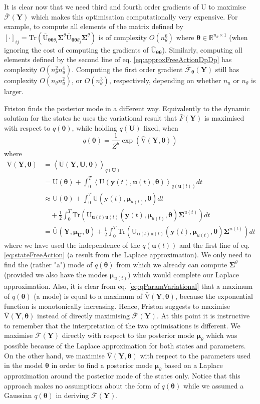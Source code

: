 \documentclass[a4paper,10pt]{article}
\newcommand{\bs}[1]{\mathbf{#1}}					%
\newcommand{\bgs}[1]{\boldsymbol{#1}}				%
\newcommand{\eq}[1]{\begin{equation} #1 \end{equation}}%
\newcommand{\trace}[1]{\mathrm{Tr}\left(#1\right)}					%
\renewcommand{\ss}{u}         %
\newcommand{\so}{y}         %
\renewcommand{\sp}{\theta}    %
\newcommand{\ps}{\bs{\ss}}    %
\newcommand{\po}{\bs{\so}}    %
\newcommand{\pp}{\bgs{\sp}} %
\newcommand{\Ps}{\bs{U}}    %
\newcommand{\Po}{\bs{Y}}    %
\newcommand{\E}[2][]{\left\langle #2 \right\rangle_{#1}}	%
\newcommand{\U}{\mathrm{U}}			%
\newcommand{\Ua}{\bar{\mathrm{U}}}		%
\newcommand{\Va}{\bar{\mathrm{V}}}		%
\newcommand{\Fa}{\bar{\mathcal{F}}}		%
\newcommand{\R}{\mathbb{R}}				%
\newcommand{\Cov}{\bgs{\Sigma}}			%
\begin{document}
It is clear now that we need third and fourth order gradients of $\U$ to maximise $\Fa(\Po)$ which makes this optimisation computationally very expensive. For example, to compute all elements of the matrix defined by $[\cdot]_{ij} = \trace{\Ua_{\pp\pp\sp_i}\Cov^\sp\Ua_{\pp\pp\sp_j}\Cov^\sp}$ is of complexity $O(n_\sp^6)$ where $\pp \in \R^{n_\sp\times 1}$ (when ignoring the cost of computing the gradients of $\Ua_{\pp\pp}$). Similarly, computing all elements defined by the second line of eq. \eqref{eq:approxFreeActionDpDp} has complexity $O(n_\sp^2n_\ss^4)$. Computing the first order gradient $\Fa_{\pp}(\Po)$ still has complexity $O(n_\sp n_\ss^2)$, or $O(n_\sp^3)$, respectively, depending on whether $n_\ss$ or $n_\sp$ is larger.

Friston finds the posterior mode in a different way. Equivalently to the dynamic solution for the states he uses the variational result that $\bar{F}(\Po)$ is maximised with respect to $q(\pp)$, while holding $q(\Ps)$ fixed, when
\eq{\label{eq:qParamVariational}
    q(\pp) = \frac{1}{Z^\sp} \exp(\Va(\Po,\pp))
}
where
\begin{align}
    \Va(\Po,\pp) &= \E[q(\Ps)]{\Ua(\Po,\Ps,\pp)}\\
    &= \U(\pp) + \int_0^T \E[q(\ps(t))]{\U(\po(t),\ps(t),\pp)} dt\\
    &\approx \U(\pp) + \int_0^T \U(\po(t),\bgs{\mu}_{\ss(t)},\pp) dt \nonumber\\
    &\quad + \frac{1}{2}\int_0^T \trace{\U_{\ps(t)\ps(t)}(\po(t),\bgs{\mu}_{\ss(t)},\pp)\Cov^{\ss(t)}} dt\\
    &= \label{eq:approxVarAction} \Ua(\Po,\bgs{\mu}_\Ps,\pp) + \frac{1}{2}\int_0^T \trace{\U_{\ps(t)\ps(t)}(\po(t),\bgs{\mu}_{\ss(t)},\pp)\Cov^{\ss(t)}}dt
\end{align}
where we have used the independence of the $q(\ps(t))$ and the first line of eq. \eqref{eq:stateFreeAction} (a result from the Laplace approximation). We only need to find the (rather "a") mode of $q(\pp)$ from which we already can compute $\Cov^\sp$ (provided we also have the modes $\bgs{\mu}_{\ss(t)}$) which would complete our Laplace approximation. Also, it is clear from eq. \eqref{eq:qParamVariational} that a maximum of $q(\pp)$ (a mode) is equal to a maximum of $\Va(\Po,\pp)$, because the exponential function is monotonically increasing. Hence, Friston suggests to maximise $\Va(\Po,\pp)$ instead of directly maximising $\Fa(\Po)$. At this point it is instructive to remember that the interpretation of the two optimisations is different. We maximise $\Fa(\Po)$ directly with respect to the posterior mode $\bgs{\mu}_\sp$ which was possible because of the Laplace approximation for both states and parameters. On the other hand, we maximise $\Va(\Po,\pp)$ with respect to the parameters used in the model $\pp$ in order to find a posterior mode $\bgs{\mu}_\sp$ based on a Laplace approximation around the posterior mode of the states only. Notice that this approach makes no assumptions about the form of $q(\pp)$ while we assumed a Gaussian $q(\pp)$ in deriving $\Fa(\Po)$.
\end{document}
